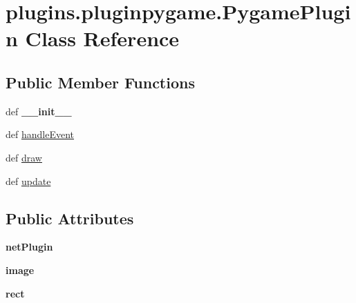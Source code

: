 \hypertarget{classplugins_1_1pluginpygame_1_1_pygame_plugin}{\section{plugins.\-pluginpygame.\-Pygame\-Plugin \-Class \-Reference}
\label{classplugins_1_1pluginpygame_1_1_pygame_plugin}
}
\subsection*{\-Public \-Member \-Functions}
\begin{DoxyCompactItemize}
\item 
\hypertarget{classplugins_1_1pluginpygame_1_1_pygame_plugin_a1e37bce5ec01c6957c3388b502ba8267}{def {\bfseries \-\_\-\-\_\-init\-\_\-\-\_\-}}\label{classplugins_1_1pluginpygame_1_1_pygame_plugin_a1e37bce5ec01c6957c3388b502ba8267}

\item 
def \hyperlink{classplugins_1_1pluginpygame_1_1_pygame_plugin_a02ff7850a401e2422f3c2612b8bf7ae8}{handle\-Event}
\item 
def \hyperlink{classplugins_1_1pluginpygame_1_1_pygame_plugin_aadd557776f2e468a83bf05a9d14520d9}{draw}
\item 
def \hyperlink{classplugins_1_1pluginpygame_1_1_pygame_plugin_a3edcae2ee1ee50d1088f728f744dafe1}{update}
\end{DoxyCompactItemize}
\subsection*{\-Public \-Attributes}
\begin{DoxyCompactItemize}
\item 
\hypertarget{classplugins_1_1pluginpygame_1_1_pygame_plugin_a32df7c107309321b0720e20386dae5d2}{{\bfseries net\-Plugin}}\label{classplugins_1_1pluginpygame_1_1_pygame_plugin_a32df7c107309321b0720e20386dae5d2}

\item 
\hypertarget{classplugins_1_1pluginpygame_1_1_pygame_plugin_a3515fd5a6f21c1cdaabbdd04d872ac84}{{\bfseries image}}\label{classplugins_1_1pluginpygame_1_1_pygame_plugin_a3515fd5a6f21c1cdaabbdd04d872ac84}

\item 
\hypertarget{classplugins_1_1pluginpygame_1_1_pygame_plugin_aeb2c06fadbab504b520173730aff053b}{{\bfseries rect}}\label{classplugins_1_1pluginpygame_1_1_pygame_plugin_aeb2c06fadbab504b520173730aff053b}

\end{DoxyCompactItemize}


